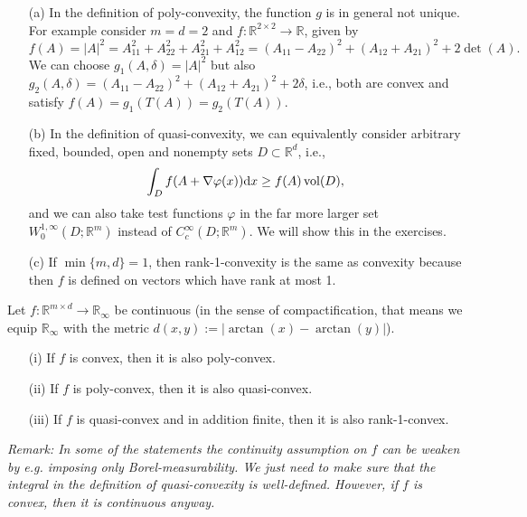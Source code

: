 \begin{remark}
\begin{itemize}
	\item[(a)] In the definition of poly-convexity, the function $g$ is in general not unique. For example consider $m=d=2$ and $f:\mathbb{R}^{2\times 2}\longrightarrow\mathbb{R}$, given by
	\[f(A)=\lvert A\rvert^2=A_{11}^2+A_{22}^2+A_{21}^2+A_{12}^2=(A_{11}-A_{22})^2+(A_{12}+A_{21})^2+2\det(A).\]
	We can choose $g_1(A,\delta)=\lvert A\rvert^2$ but also $g_2(A,\delta)=(A_{11}-A_{22})^2+(A_{12}+A_{21})^2+2\delta$, i.e., both are convex and satisfy $f(A)=g_1(T(A))=g_2(T(A))$.
	\item[(b)] In the definition of quasi-convexity, we can equivalently consider arbitrary fixed, bounded, open and nonempty sets $D\subset\mathbb{R}^d$, i.e.,
	\[\int_D{f(A+\nabla\varphi(x))\mathrm{d}x}\geq f(A)\operatorname{vol}\mathopen{}\left(D\right)\mathclose{},\]
	and we can also take test functions $\varphi$ in the far more larger set $W_0^{1,\infty}(D;\mathbb{R}^m)$ instead of $C_c^\infty(D;\mathbb{R}^m)$. We will show this in the exercises.
	\item[(c)] If $\min\{m,d\}=1$, then rank-1-convexity is the same as convexity because then $f$ is defined on vectors which have rank at most 1.\\[11pt]
\end{itemize}
\end{remark}

\begin{theorem}
Let $f:\mathbb{R}^{m\times d}\longrightarrow\mathbb{R}_\infty$ be continuous (in the sense of compactification, that means we equip $\mathbb{R}_\infty$ with the metric $d(x,y):=\lvert\arctan(x)-\arctan(y)\rvert$).
\begin{itemize}
	\item[(i)] If $f$ is convex, then it is also poly-convex.
	\item[(ii)] If $f$ is poly-convex, then it is also quasi-convex.
	\item[(iii)] If $f$ is quasi-convex and in addition finite, then it is also rank-1-convex.\\
\end{itemize}
\end{theorem}

\begin{remark}
\textit{Remark: In some of the statements the continuity assumption on $f$ can be weaken by e.g. imposing only Borel-measurability. We just need to make sure that the integral in the definition of quasi-convexity is well-defined. However, if $f$ is convex, then it is continuous anyway.}
\end{remark}

